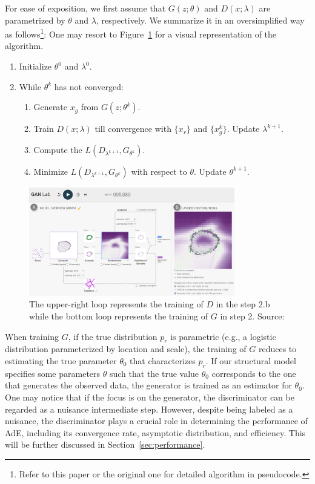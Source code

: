 \documentclass[12pt]{article}
\begin{document}
For ease of exposition, we first assume that $G(z;\theta)$ and $D(x;\lambda)$
are parametrized by $\theta$ and $\lambda$, respectively. We summarize it in an
oversimplified way as follows\footnote{Refer to this paper
    \citet{kaji2023adversarial} or the original one
    \citet{goodfellow2014generative} for detailed algorithm in pseudocode.}: One
may resort to Figure~\ref{fig:algorithm} for a visual representation of the
algorithm.
\begin{enumerate}
    \item Initialize $\theta^0$ and $\lambda^0$.
    \item While $\theta^k$ has not converged:
          \begin{enumerate}
              \item Generate $x_g$ from $G(z;\theta^k)$.
              \item Train $D(x;\lambda)$ till convergence with $\{x_r\}$ and $\{x^k_g\}$. Update
                    $\lambda^{k+1}$.
              \item Compute the $L(D_{\lambda^{k+1}},G_{\theta^k})$.
              \item Minimize $L(D_{\lambda^{k+1}},G_{\theta^k})$ with respect to $\theta$. Update
                    $\theta^{k+1}$.
          \end{enumerate}
\end{enumerate}

\begin{figure}[!htbp]
    \centering
    \includegraphics[width=0.8\textwidth]{../Figures/Algorithm.png}
    \caption{The upper-right loop represents the training of $D$ in the step 2.b while the bottom loop represents the training of $G$ in step 2. Source: \citet{kahng2018gan}}
    \label{fig:algorithm}
\end{figure}

When training \(G\), if the true distribution \(p_r\) is parametric (e.g., a
logistic distribution parameterized by location and scale), the training of
\(G\) reduces to estimating the true parameter \(\theta_0\) that characterizes
\(p_r\). If our structural model specifies some parameters \(\theta\) such that
the true value \(\theta_0\) corresponds to the one that generates the observed
data, the generator is trained as an estimator for \(\theta_0\). One may notice
that if the focus is on the generator, the discriminator can be regarded as a
nuisance intermediate step. However, despite being labeled as a nuisance, the
discriminator plays a crucial role in determining the performance of AdE,
including its convergence rate, asymptotic distribution, and efficiency. This
will be further discussed in Section~\ref{sec:performance}.
\end{document}
